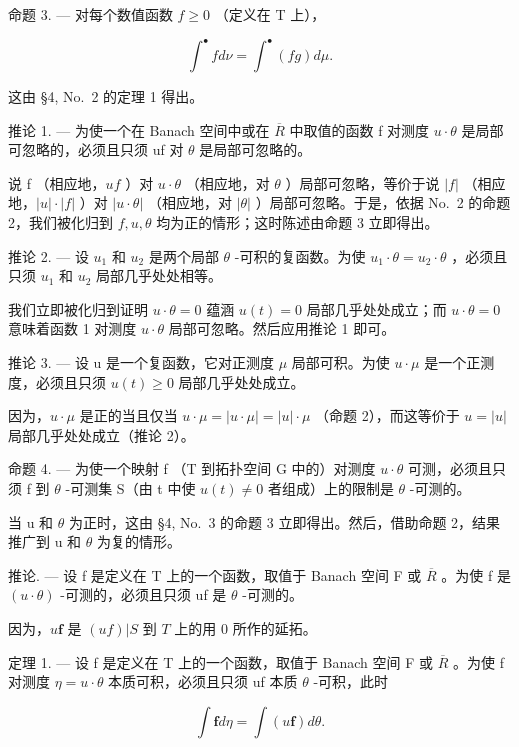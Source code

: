 命题 3. --- 对每个数值函数 \(f \geqslant 0\) （定义在 T 上），

\[
\int^ {\bullet} f d \nu = \int^ {\bullet} (f g) d \mu .\tag{5}
\]

这由 §4, No.~2 的定理 1 得出。

推论 1. --- 为使一个在 Banach 空间中或在 \(\overline{R}\) 中取值的函数 f 对测度 \(u \cdot \theta\) 是局部可忽略的，必须且只须 uf 对 \(\theta\) 是局部可忽略的。

说 f （相应地，\(uf\) ）对 \(u \cdot \theta\) （相应地，对 \(\theta\) ）局部可忽略，等价于说 \(|f|\) （相应地，\(|u| \cdot |f|\) ）对 \(|u \cdot \theta|\) （相应地，对 \(|\theta|\) ）局部可忽略。于是，依据 No.~2 的命题 2，我们被化归到 \(f, u, \theta\) 均为正的情形；这时陈述由命题 3 立即得出。

推论 2. --- 设 \(u_1\) 和 \(u_2\) 是两个局部 \(\theta\) -可积的复函数。为使 \(u_1 \cdot \theta = u_2 \cdot \theta\) ，必须且只须 \(u_1\) 和 \(u_2\) 局部几乎处处相等。

我们立即被化归到证明 \(u \cdot \theta = 0\) 蕴涵 \(u(t) = 0\) 局部几乎处处成立；而 \(u \cdot \theta = 0\) 意味着函数 1 对测度 \(u \cdot \theta\) 局部可忽略。然后应用推论 1 即可。

推论 3. --- 设 u 是一个复函数，它对正测度 \(\mu\) 局部可积。为使 \(u \cdot \mu\) 是一个正测度，必须且只须 \(u(t) \geqslant 0\) 局部几乎处处成立。

因为，\(u \cdot \mu\) 是正的当且仅当 \(u \cdot \mu = |u \cdot \mu| = |u| \cdot \mu\) （命题 2），而这等价于 \(u = |u|\) 局部几乎处处成立（推论 2）。

命题 4. --- 为使一个映射 f （T 到拓扑空间 G 中的）对测度 \(u \cdot \theta\) 可测，必须且只须 f 到 \(\theta\) -可测集 S（由 t 中使 \(u(t) \neq 0\) 者组成）上的限制是 \(\theta\) -可测的。

当 u 和 \(\theta\) 为正时，这由 §4, No.~3 的命题 3 立即得出。然后，借助命题 2，结果推广到 u 和 \(\theta\) 为复的情形。

推论. --- 设 f 是定义在 T 上的一个函数，取值于 Banach 空间 F 或 \(\overline{R}\) 。为使 f 是 \((u\cdot\theta)\) -可测的，必须且只须 uf 是 \(\theta\) -可测的。

因为，\(u\mathbf{f}\) 是 \((uf)|S\) 到 \(T\) 上的用 0 所作的延拓。

定理 1. --- 设 f 是定义在 T 上的一个函数，取值于 Banach 空间 F 或 \(\overline{R}\) 。为使 f 对测度 \(\eta = u\cdot \theta\) 本质可积，必须且只须 uf 本质 \(\theta\) -可积，此时

\[
\int \mathbf {f} d \eta = \int (u \mathbf {f}) d \theta .\tag{6}
\]


